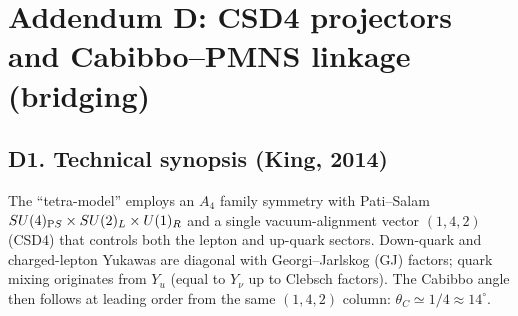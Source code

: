 \documentclass[11pt]{article}
\begin{document}
  \titlepageOpen

  \begin{abstract}


  \end{abstract}

  \titlepageClose
  \fi

  \ifdefined\standalonechapter
  \section{\papertitle}
  \else
  \fi



  \section*{Addendum D: CSD4 projectors and Cabibbo–PMNS linkage (bridging)}

      \subsection*{D1. Technical synopsis (King, 2014)}
          The ``tetra-model'' employs an $A_4$ family symmetry with Pati–Salam
          $SU(4)_{\textrm PS}\times SU(2)_L\times U(1)_R$ and a single vacuum-alignment vector
          $(1,4,2)$ (CSD4) that controls both the lepton and up-quark sectors. Down-quark
          and charged-lepton Yukawas are diagonal with Georgi–Jarlskog (GJ) factors; quark
          mixing originates from $Y_u$ (equal to $Y_\nu$ up to Clebsch factors). The Cabibbo
          angle then follows at leading order from the same $(1,4,2)$ column: $\theta_C\simeq 1/4 \approx 14^\circ$.
\end{document}
